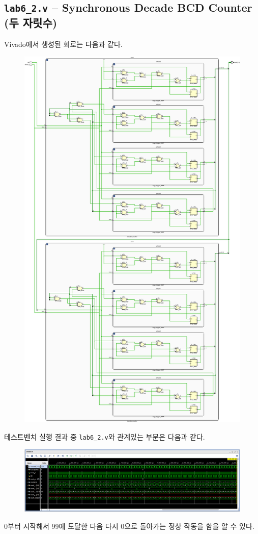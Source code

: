 \documentclass{scrartcl}
\begin{document}
\subsection{\texttt{lab6\_2.v} -- Synchronous Decade BCD Counter (두 자릿수)}
Vivado에서 생성된 회로는 다음과 같다.
\begin{figure}[H]
  \centering
  \includegraphics[width=0.9\linewidth]{lab6_2_schematic-crop.pdf}
\end{figure}

테스트벤치 실행 결과 중 \texttt{lab6\_2.v}와 관계있는 부분은 다음과 같다.
\begin{figure}[H]
  \centering
  \includegraphics[width=0.9\linewidth]{lab6_2_waveform.png}
\end{figure}
0부터 시작해서 99에 도달한 다음 다시 0으로 돌아가는 정상 작동을 함을 알 수 있다.
\end{document}
